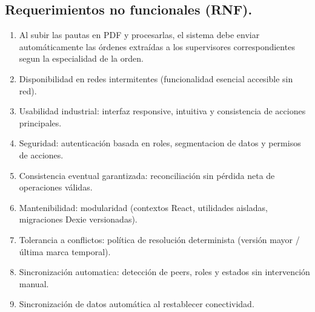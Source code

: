\documentclass[10pt,a4paper]{report}
\begin{document}
\subsection*{Requerimientos no funcionales (RNF).}
\begin{enumerate}
    \item [\textbf{RNF1.}] Al subir las pautas en PDF y procesarlas, el sistema debe enviar automáticamente las órdenes extraídas a los supervisores correspondientes segun la especialidad de la orden.
    \item [\textbf{RNF2.}] Disponibilidad en redes intermitentes (funcionalidad esencial accesible sin red).
    \item [\textbf{RNF3.}] Usabilidad industrial: interfaz responsive, intuitiva y consistencia de acciones principales.
    \item [\textbf{RNF4.}] Seguridad: autenticación basada en roles, segmentacion de datos y permisos de acciones.
    \item [\textbf{RNF5.}] Consistencia eventual garantizada: reconciliación sin pérdida neta de operaciones válidas.
    \item [\textbf{RNF6.}] Mantenibilidad: modularidad (contextos React, utilidades aisladas, migraciones Dexie versionadas).
    \item [\textbf{RNF7.}] Tolerancia a conflictos: política de resolución determinista (versión mayor / última marca temporal).
    \item [\textbf{RNF8.}] Sincronización automatica: detección de peers, roles y estados sin intervención manual.
    \item [\textbf{RNF9.}] Sincronización de datos automática al restablecer conectividad.
\end{enumerate}
\end{document}
